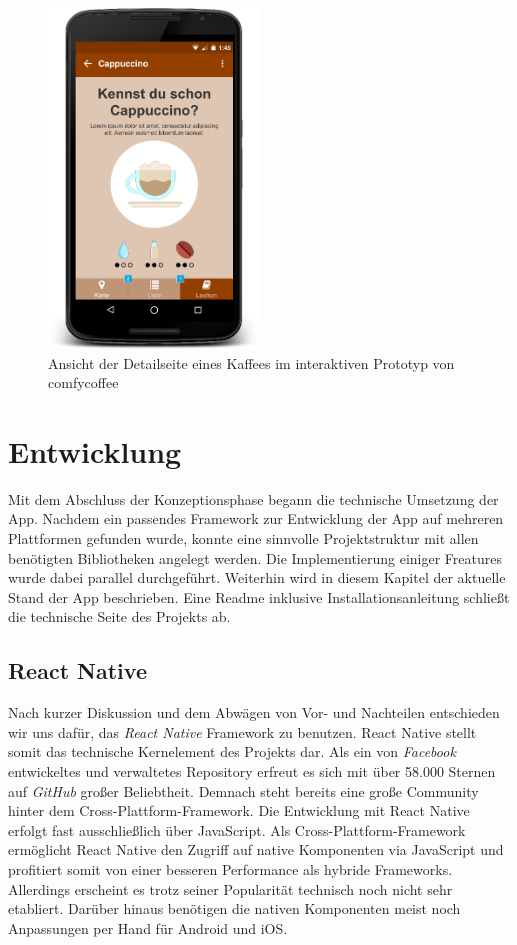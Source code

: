 \begin{figure}[h!]
    \centering
		\includegraphics[width=0.5\textwidth]{Bilder/detail.png}
		\caption{Ansicht der Detailseite eines Kaffees im interaktiven Prototyp von comfycoffee}
		\label{fig:prototyp}
\end{figure}

\chapter{Entwicklung}
\label{entwicklung}
Mit dem Abschluss der Konzeptionsphase begann die technische Umsetzung der App.
Nachdem ein passendes Framework zur Entwicklung der App auf mehreren Plattformen gefunden wurde, konnte eine sinnvolle Projektstruktur mit allen benötigten Bibliotheken angelegt werden.
Die Implementierung einiger Freatures wurde dabei parallel durchgeführt.
Weiterhin wird in diesem Kapitel der aktuelle Stand der App beschrieben.
Eine Readme inklusive Installationsanleitung schließt die technische Seite des Projekts ab.

\section{React Native}
\label{sec:reactnative}
Nach kurzer Diskussion und dem Abwägen von Vor- und Nachteilen entschieden wir uns dafür, das \emph{React Native} Framework zu benutzen.
React Native stellt somit das technische Kernelement des Projekts dar.
Als ein von \emph{Facebook} entwickeltes und verwaltetes Repository erfreut es sich mit über 58.000 Sternen auf \emph{GitHub} großer Beliebtheit.
Demnach steht bereits eine große Community hinter dem Cross-Plattform-Framework.
Die Entwicklung mit React Native erfolgt fast ausschließlich über JavaScript.
Als Cross-Plattform-Framework ermöglicht React Native den Zugriff auf native Komponenten via JavaScript und profitiert somit von einer besseren Performance als hybride Frameworks.
Allerdings erscheint es trotz seiner Popularität technisch noch nicht sehr etabliert.
Darüber hinaus benötigen die nativen Komponenten meist noch Anpassungen per Hand für Android und iOS.

